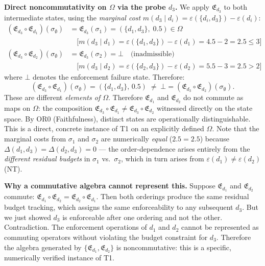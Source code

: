 \documentclass[11pt]{article}
\theoremstyle{remark}
\begin{document}
\textbf{Direct noncommutativity on $\Omega$ via the probe $d_3$.}  We apply $\mathfrak{E}_{d_3}$ to both intermediate states, using the \emph{marginal cost} $m(d_3 \mid d_i) = \varepsilon(\{d_i,d_3\}) - \varepsilon(d_i)$:
\begin{align*}
(\mathfrak{E}_{d_3} \circ \mathfrak{E}_{d_1})(\sigma_\emptyset)
  &= \mathfrak{E}_{d_3}(\sigma_1) = (\{d_1,d_3\},\; 0.5) \in \Omega \\
  &\quad\bigl[m(d_3 \mid d_1) = \varepsilon(\{d_1,d_3\}) - \varepsilon(d_1) = 4.5 - 2 = 2.5 \le 3\bigr]\\[4pt]
(\mathfrak{E}_{d_3} \circ \mathfrak{E}_{d_2})(\sigma_\emptyset)
  &= \mathfrak{E}_{d_3}(\sigma_2) = \bot \quad\text{(inadmissible)} \\
  &\quad\bigl[m(d_3 \mid d_2) = \varepsilon(\{d_2,d_3\}) - \varepsilon(d_2) = 5.5 - 3 = 2.5 > 2\bigr]
\end{align*}
where $\bot$ denotes the enforcement failure state.  Therefore:
\[
(\mathfrak{E}_{d_3} \circ \mathfrak{E}_{d_1})(\sigma_\emptyset)
  = (\{d_1,d_3\},\,0.5)
\;\ne\;
\bot
  = (\mathfrak{E}_{d_3} \circ \mathfrak{E}_{d_2})(\sigma_\emptyset).
\]
These are different \emph{elements of $\Omega$}.  Therefore $\mathfrak{E}_{d_1}$
and $\mathfrak{E}_{d_2}$ do not commute as maps on $\Omega$: the composition
$\mathfrak{E}_{d_3} \circ \mathfrak{E}_{d_1} \ne \mathfrak{E}_{d_3} \circ
\mathfrak{E}_{d_2}$ witnessed directly on the state space.  By OR0 (Faithfulness),
distinct states are operationally distinguishable.  This is a direct, concrete
instance of T1 on an explicitly defined $\Omega$.  Note that the marginal costs from $\sigma_1$ and $\sigma_2$ are numerically \emph{equal} ($2.5 = 2.5$) because $\Delta(d_1,d_3) = \Delta(d_2,d_3) = 0$ --- the order-dependence arises entirely from the \emph{different residual budgets} in $\sigma_1$ vs.\ $\sigma_2$, which in turn arises from $\varepsilon(d_1) \ne \varepsilon(d_2)$ (NT).

\textbf{Why a commutative algebra cannot represent this.}  Suppose
$\mathfrak{E}_{d_1}$ and $\mathfrak{E}_{d_2}$ commute: $\mathfrak{E}_{d_1}
\circ \mathfrak{E}_{d_2} = \mathfrak{E}_{d_2} \circ \mathfrak{E}_{d_1}$.
Then both orderings produce the same residual budget tracking, which assigns the
same enforceability to any subsequent $d_3$.  But we just showed $d_3$ is
enforceable after one ordering and not the other.  Contradiction.  The
enforcement operations of $d_1$ and $d_2$ cannot be represented as commuting
operators without violating the budget constraint for $d_3$.  Therefore the
algebra generated by $\{\mathfrak{E}_{d_1}, \mathfrak{E}_{d_2}\}$ is
noncommutative: this is a specific, numerically verified instance of T1.
\end{document}
